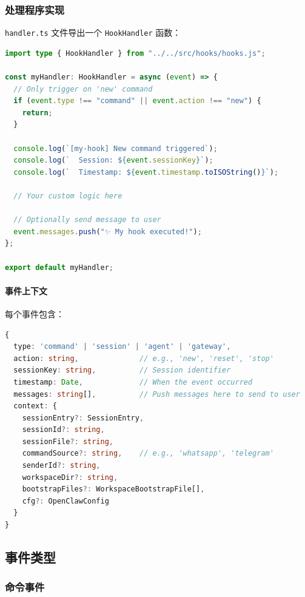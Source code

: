 \subsubsection{处理程序实现}


\texttt{handler.ts} 文件导出一个 \texttt{HookHandler} 函数：

\begin{lstlisting}[language=typescript]
import type { HookHandler } from "../../src/hooks/hooks.js";

const myHandler: HookHandler = async (event) => {
  // Only trigger on 'new' command
  if (event.type !== "command" || event.action !== "new") {
    return;
  }

  console.log(`[my-hook] New command triggered`);
  console.log(`  Session: ${event.sessionKey}`);
  console.log(`  Timestamp: ${event.timestamp.toISOString()}`);

  // Your custom logic here

  // Optionally send message to user
  event.messages.push("✨ My hook executed!");
};

export default myHandler;
\end{lstlisting}


\paragraph{事件上下文}


每个事件包含：

\begin{lstlisting}[language=typescript]
{
  type: 'command' | 'session' | 'agent' | 'gateway',
  action: string,              // e.g., 'new', 'reset', 'stop'
  sessionKey: string,          // Session identifier
  timestamp: Date,             // When the event occurred
  messages: string[],          // Push messages here to send to user
  context: {
    sessionEntry?: SessionEntry,
    sessionId?: string,
    sessionFile?: string,
    commandSource?: string,    // e.g., 'whatsapp', 'telegram'
    senderId?: string,
    workspaceDir?: string,
    bootstrapFiles?: WorkspaceBootstrapFile[],
    cfg?: OpenClawConfig
  }
}
\end{lstlisting}


\subsection{事件类型}


\subsubsection{命令事件}


